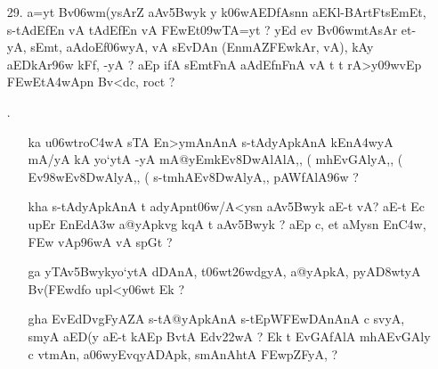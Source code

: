 \def\DevnagVersion{2.15}\documentclass{article}
\begin{document}
\begin{itemize}
 \item[29.] {\dn a=y\?t Bv\306wm(ysAr\?Z aAv\35Bwyk y k\?\306wAEDfAsn\?n aEKl{\rs -\re}BArtFtsEmEt, s\2-tAd\?EfEn vA tAd\?EfEn vA \3FEwEt\309wTA=y\?t {\rs ?\re} yEd ev Bv\306wmtAsAr et-yA, sEmt\?, aAdoEf\306wyA, vA s\2EvDAn\2 {\rs (\re}EnmA\0Z\3FEwkAr, vA{\rs ),\re} kAy\0 aEDkAr\396w kFf, -yA {\rs ?\re} aEp ifA\2 sEmtFnA aAd\?EfnFnA\2 vA t\? t\? rA>y\?\309wvEp \3FEwEt\3A4wApn\2 Bv<dc, roc\?t {\rs ?\re}}
 
 \item[\dn 30.] \begin{itemize}
                 
                 \item[\dn ka] {\dn u\306wtro\3C4wA s\2TA En>ymAnAnA\2 s\2-tAdyApkAnA\2 kEn\3A4wyA mA/yA kA yo`ytA -yA\dn {} mA@yEmkEv\38DwAlAlA,{\rs ,\re} {\rs (\re}\dn {} mhEvGAlyA,{\rs ,\re} {\rs (\re}\dn {} Ev\398wEv\38DwAlyA,{\rs ,\re} {\rs (\re}\dn {} s\2-tmhAEv\38DwAlyA,{\rs ,\re} pAWfAlA\396w {\rs ?\re}}
                 
                 \item[\dn kha] {\dn s\2-tAdyApkAnA\2 t\? adyApnt\306w/A<ysn aAv\35Bwyk aE-t vA{\rs ?\re} aE-t Ec upEr EnEd\3A3w\? a@yApkvg\?{\qvb} k\?qA\2 t aAv\35Bwyk {\rs ?\re} aEp c{\rs ,\re} et aMysn En\3C4w\?, \3FEw vAp\396wA vA s\2pG\?t {\rs ?\re}} 
                 
                 \item[\dn ga] {\dn yTAv\35Bwykyo`ytA\2 dDAnA, t\306wt\326wdg\?{\qvb}yA, a@yApkA, pyA\0\3D8wtyA Bv(\3FEwd\?fo upl<y\306wt\? Ek {\rs ?\re}}
                 
                 \item[\dn gha] {\dn EvEdDvgF{\qvb}yAZA\2 s\2-tA@yApkAnA\2 s\2-tEpW\3FEwDAnAnA\2 c s\?vyA, smyA aED(y aE-t kAEp BvtA\2 Edv\322wA {\rs ?\re} Ek\2  t\? EvGAfAlA mhAEvGAly\? c vt\0mAn\4, a\306wyEvqyADApk\4, smAnAh\0tA\2 \3FEwpZFyA, {\rs ?\re}}  
                 \end{itemize}
                 
  \item[\dn 31] \begin{itemize}
                 

\end{itemize}
\end{itemize}
\end{document}
